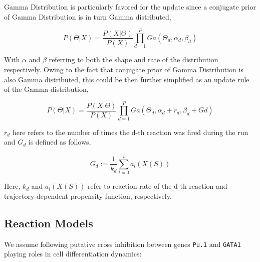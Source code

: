 \documentclass{bioinfo}
\begin{document}
Gamma Distribution is particularly favored for the update since a conjugate prior of Gamma Distribution is in turn Gamma distributed,

\begin{equation}
P(\Theta | X) = \frac{P(X | \Theta)}{P (X)} \prod_{d=1}^{P} Ga(\Theta_d, \alpha_d, \beta_d)\label{eq:19}
\end{equation}

With $\alpha$ and $\beta$ referring to both the shape and rate of the distribution respectively. Owing to the fact that conjugate prior of Gamma Distribution is also Gamma distributed, this could be then further simplified as an update rule of the Gamma distribution,

\begin{equation}
P(\Theta | X) = \frac{P(X | \Theta)}{P (X)} \prod_{d=1}^{P} Ga(\Theta_d, \alpha_d + r_d, \beta_d + Gd)\label{eq:20}
\end{equation}

$r_d$ here refers to the number of times the d-th reaction was fired during the run and $G_d$ is defined as follows,

\begin{equation}
G_d := \frac{1}{k_d} \sum_{l=0}^{i} a_{l}(X(S))\label{eq:21}
\end{equation}

Here, $k_d$ and $a_{l}(X(S))$ refer to reaction rate of the d-th reaction and trajectory-dependent propensity function, respectively.

\subsection{Reaction Models}

We assume following putative cross inhibition between genes \texttt{Pu.1} and \texttt{GATA1} playing roles in cell differentiation dynamics:

\begin{center}
\end{center}
\end{document}
